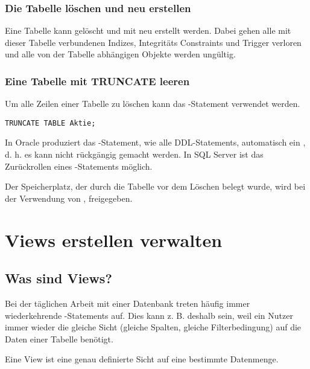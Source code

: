         \subsubsection{Die Tabelle l\"oschen und neu erstellen}
          \label{dropandrecreatetable}
          Eine Tabelle kann gel\"oscht und mit  neu
          erstellt werden. Dabei gehen alle mit dieser Tabelle verbundenen
          Indizes, Integrit\"ats Constraints und Trigger verloren und alle von
          der Tabelle abh\"angigen Objekte werden ung\"ultig.
        \subsubsection{Eine Tabelle mit TRUNCATE leeren}
          Um alle Zeilen einer Tabelle zu l\"oschen kann das -Statement verwendet werden.
          \begin{lstlisting}[language=oracle_sql, caption={Zeilen mit TRUNCATE
          abschneiden},label=sql08_23]
TRUNCATE TABLE Aktie;
          \end{lstlisting}
\clearpage
          \begin{merke}
            In Oracle produziert das -Statement, wie
            alle DDL-Statements, automatisch ein , d. h.
            es kann nicht r\"uckg\"angig gemacht werden. In SQL Server ist das
            Zur\"uckrollen eines -Statements m\"oglich.
          \end{merke}

          \begin{merke}
            Der Speicherplatz, der durch die Tabelle vor dem L\"oschen belegt
            wurde, wird bei der Verwendung von ,
            freigegeben.
          \end{merke}
    \section{Views erstellen verwalten}
      \subsection{Was sind Views?}
        Bei der t\"aglichen Arbeit mit einer Datenbank treten h\"aufig immer wiederkehrende \SELECT-Statements auf. Dies kann z. B. deshalb sein, weil ein Nutzer immer wieder die gleiche Sicht (gleiche Spalten, gleiche Filterbedingung) auf die Daten einer Tabelle ben\"otigt.
        \begin{merke}
          Eine View ist eine genau definierte Sicht auf eine bestimmte Datenmenge.
        \end{merke}
